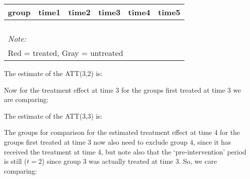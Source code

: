 \documentclass[
]{article}
\begin{document}
\begin{table}
\centering
\begin{tabular}[t]{>{}r|>{}r|>{}r|>{}r|>{}r|>{}r}
\hline
group & time1 & time2 & time3 & time4 & time5\\
\hline
\cellcolor{white}{2} & \cellcolor{white}{\textcolor{black}{0.631}} & \cellcolor{white}{\textcolor{black}{0.711}} & \cellcolor{white}{0.814} & \cellcolor{white}{0.846} & \cellcolor{white}{0.826}\\
\hline
\cellcolor{white}{3} & \cellcolor{red}{\textcolor{black}{0.678}} & \cellcolor{red}{\textcolor{black}{0.770}} & \cellcolor{white}{0.664} & \cellcolor{white}{0.800} & \cellcolor{white}{0.784}\\
\hline
\cellcolor{white}{4} & \cellcolor{lightgray}{\textcolor{black}{0.778}} & \cellcolor{lightgray}{\textcolor{black}{0.807}} & \cellcolor{white}{0.673} & \cellcolor{white}{0.750} & \cellcolor{white}{0.868}\\
\hline
\cellcolor{white}{5} & \cellcolor{lightgray}{\textcolor{black}{0.854}} & \cellcolor{lightgray}{\textcolor{black}{0.939}} & \cellcolor{white}{0.854} & \cellcolor{white}{0.800} & \cellcolor{white}{0.855}\\
\hline
\multicolumn{6}{l}{\rule{0pt}{1em}\textit{Note: }}\\
\multicolumn{6}{l}{\rule{0pt}{1em}Red = treated, Gray = untreated}\\
\end{tabular}
\end{table}

The estimate of the ATT(3,2) is:

Now for the treatment effect at time 3 for the groups first treated at
time 3 we are comparing:

The estimate of the ATT(3,3) is:

The groups for comparison for the estimated treatment effect at time 4
for the groups first treated at time 3 now also need to exclude group 4,
since it has received the treatment at time 4, but note also that the
`pre-intervention' period is still (\(t=2\)) since group 3 was actually
treated at time 3. So, we care comparing:
\end{document}
